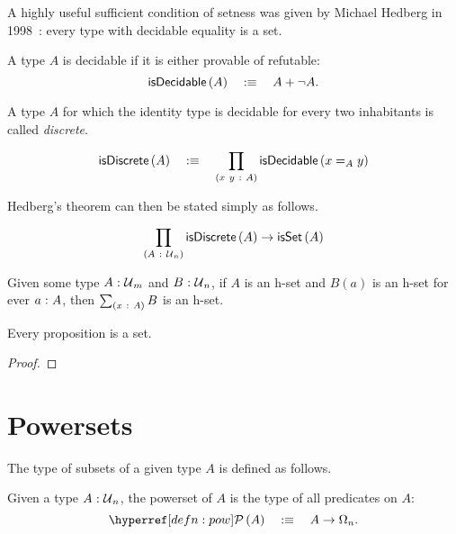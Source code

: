 A highly useful sufficient condition of setness was given by Michael Hedberg in
1998~\cite{hedberg}: every type with decidable equality is a set.
\begin{defn}[Decidability]
  A type $A$ is decidable if it is either provable of refutable:
  \begin{equation*}
    \mathsf{isDecidable}\left(A\right) \quad:\equiv\quad A + \neg A.
  \end{equation*}
\end{defn}

A type $A$ for which the identity type is decidable for every two inhabitants is called
\emph{discrete}.
\begin{defn}[Discrete]
  \begin{equation*}
    \mathsf{isDiscrete}\left(A\right) \quad:\equiv\quad \prod_{(x~y~:~A)} \mathsf{isDecidable}\left(x =_A y\right)
  \end{equation*}
\end{defn}

Hedberg's theorem can then be stated simply as follows.
\begin{thm}[Hedberg]\label{thm:hedberg}
  \begin{equation*}
    \prod_{(A~:~\mathcal{U}{}_n)} \mathsf{isDiscrete}\left(A\right) \rightarrow \mathsf{isSet}\left(A\right)
  \end{equation*}
\end{thm}

\begin{prop}\label{prop:sigma-set}
  Given some type $A\hspace{0.1mm}:\hspace{0.1mm}\mathcal{U}{}_m$ and $B\hspace{0.1mm}:\hspace{0.1mm}\mathcal{U}{}_n$, if $A$ is an h-set
  and $B(a)$ is an h-set for ever $a\hspace{0.1mm}:\hspace{0.1mm}A$, then $\sum_{(x~:~A)} B$ is an h-set.
\end{prop}

\begin{prop}\label{prop:prop-is-set}
  Every proposition is a set.
\end{prop}
\begin{proof}
\end{proof}

\section{Powersets}\label{sec:pow}

The type of subsets of a given type $A$ is defined as follows.

\begin{defn}\label{defn:pow}
  Given a type $A\hspace{0.1mm}:\hspace{0.1mm}\mathcal{U}{}_n$, the powerset of $A$ is the type of all predicates
  on $A$:
  \begin{equation*}
    \pow{A} \quad\is\quad A \rightarrow \Omega_n.
  \end{equation*}
\end{defn}


